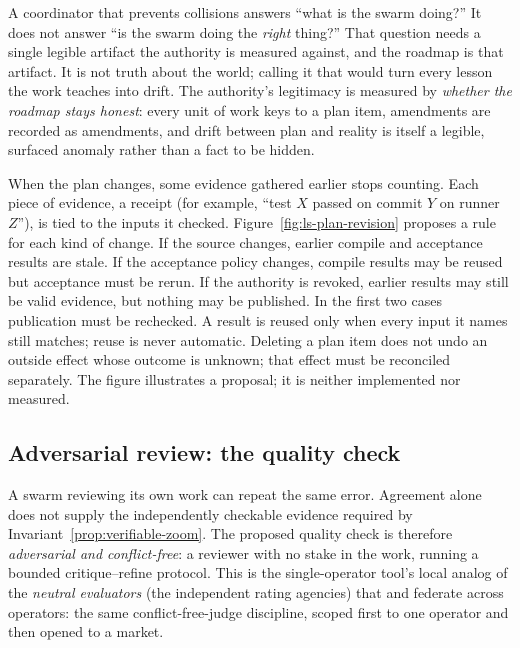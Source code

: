 \documentclass[11pt,a4paper]{article}
\theoremstyle{definition}
\theoremstyle{plain}
\newcounter{protocol}[section]
\begin{document}
A coordinator that prevents collisions answers ``what is the swarm doing?'' It does
not answer ``is the swarm doing the \emph{right} thing?'' That question needs a
single legible artifact the authority is measured against, and the roadmap is
that artifact. It is not truth about the
world; calling it that would turn every lesson the work teaches into drift. The
authority's legitimacy is measured by \emph{whether the roadmap stays honest}: every
unit of work keys to a plan item, amendments are recorded as amendments, and drift
between plan and reality is itself a legible, surfaced anomaly rather than a fact to
be hidden.

When the plan changes, some evidence gathered earlier stops counting. Each
piece of evidence, a receipt (for example, ``test $X$ passed on commit $Y$ on
runner $Z$''), is tied to the inputs it checked.
Figure~\ref{fig:ls-plan-revision} proposes a rule for each kind of change. If
the source changes, earlier compile and acceptance results are stale. If the
acceptance policy changes, compile results may be reused but acceptance must be
rerun. If the authority is revoked, earlier results may still be valid
evidence, but nothing may be published. In the first two cases publication
must be rechecked. A result is reused only when every input it names still
matches; reuse is never automatic. Deleting a plan item does not undo an
outside effect whose outcome is unknown; that effect must be reconciled
separately. The figure illustrates a proposal; it is neither implemented nor
measured.


\subsection{Adversarial review: the quality check}\label{sec:review}

A swarm reviewing its own work can repeat the same error. Agreement alone does
not supply the independently checkable evidence required by
Invariant~\ref{prop:verifiable-zoom}. The proposed quality check is therefore
\emph{adversarial and conflict-free}: a reviewer with no stake in the work, running a
bounded critique--refine protocol. This is the single-operator tool's local analog of the
\emph{neutral evaluators} (the independent rating agencies) that  and 
federate across operators: the same conflict-free-judge discipline, scoped
first to one operator and then opened to a market.
\end{document}
